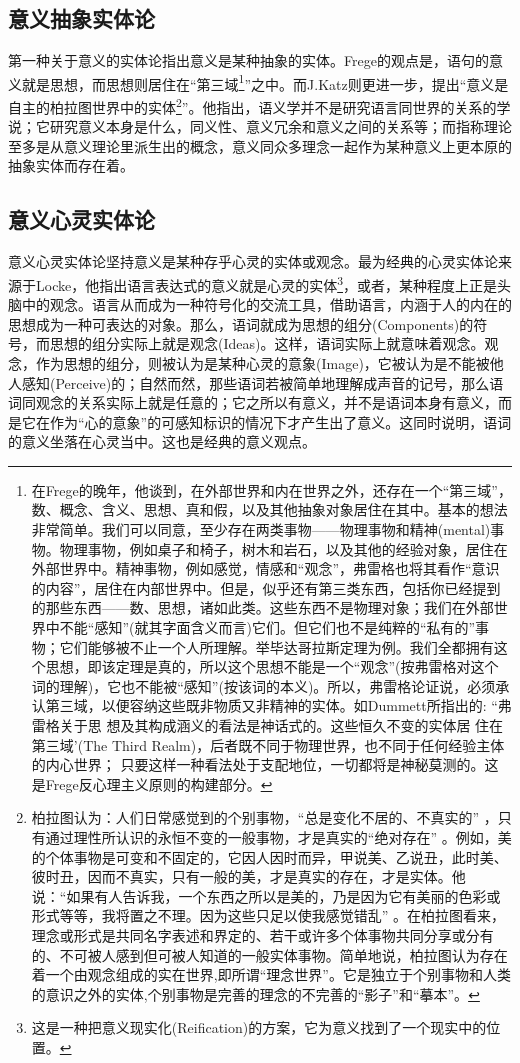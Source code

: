 \documentclass{article}
\begin{document}
\subsection{意义抽象实体论}
第一种关于意义的实体论指出意义是某种抽象的实体。Frege的观点是，语句的意义就是思想，而思想则居住在“第三域\footnote{在Frege的晚年，他谈到，在外部世界和内在世界之外，还存在一个“第三域”，数、概念、含义、思想、真和假，以及其他抽象对象居住在其中。基本的想法非常简单。我们可以同意，至少存在两类事物——物理事物和精神(mental)事物。物理事物，例如桌子和椅子，树木和岩石，以及其他的经验对象，居住在外部世界中。精神事物，例如感觉，情感和“观念”，弗雷格也将其看作“意识的内容”，居住在内部世界中。但是，似乎还有第三类东西，包括你已经提到的那些东西——数、思想，诸如此类。这些东西不是物理对象；我们在外部世界中不能“感知”(就其字面含义而言)它们。但它们也不是纯粹的“私有的”事物；它们能够被不止一个人所理解。举毕达哥拉斯定理为例。我们全都拥有这个思想，即该定理是真的，所以这个思想不能是一个“观念”(按弗雷格对这个词的理解)，它也不能被“感知”(按该词的本义)。所以，弗雷格论证说，必须承认第三域，以便容纳这些既非物质又非精神的实体。如Dummett所指出的: “弗雷格关于思
想及其构成涵义的看法是神话式的。这些恒久不变的实体居 
住在第三域’(The Third Realm)，后者既不同于物理世界，也不同于任何经验主体的内心世界；
只要这样一种看法处于支配地位，一切都将是神秘莫测的。这是Frege反心理主义原则的构建部分。}”之中。而J.Katz则更进一步，提出“意义是自主的柏拉图世界中的实体\footnote{柏拉图认为：人们日常感觉到的个别事物，“总是变化不居的、不真实的” ，只有通过理性所认识的永恒不变的一般事物，才是真实的“绝对存在” 。例如，美的个体事物是可变和不固定的，它因人因时而异，甲说美、乙说丑，此时美、彼时丑，因而不真实，只有一般的美，才是真实的存在，才是实体。他说：“如果有人告诉我，一个东西之所以是美的，乃是因为它有美丽的色彩或形式等等，我将置之不理。因为这些只足以使我感觉错乱” 。在柏拉图看来，理念或形式是共同名字表述和界定的、若干或许多个体事物共同分享或分有的、不可被人感到但可被人知道的一般实体事物。简单地说，柏拉图认为存在着一个由观念组成的实在世界,即所谓“理念世界”。它是独立于个别事物和人类的意识之外的实体,个别事物是完善的理念的不完善的“影子”和“摹本”。}”。他指出，语义学并不是研究语言同世界的关系的学说；它研究意义本身是什么，同义性、意义冗余和意义之间的关系等；而指称理论至多是从意义理论里派生出的概念，意义同众多理念一起作为某种意义上更本原的抽象实体而存在着。
\subsection{意义心灵实体论}
意义心灵实体论坚持意义是某种存乎心灵的实体或观念。最为经典的心灵实体论来源于Locke，他指出语言表达式的意义就是心灵的实体\footnote{这是一种把意义现实化(Reification)的方案，它为意义找到了一个现实中的位置。}，或者，某种程度上正是头脑中的观念。语言从而成为一种符号化的交流工具，借助语言，内涵于人的内在的思想成为一种可表达的对象。那么，语词就成为思想的组分(Components)的符号，而思想的组分实际上就是{\heiti 观念}(Ideas)。这样，语词实际上就意味着观念。观念，作为思想的组分，则被认为是某种心灵的意象(Image)，它被认为是不能被他人感知(Perceive)的；自然而然，那些语词若被简单地理解成声音的记号，那么语词同观念的关系实际上就是任意的；它之所以有意义，并不是语词本身有意义，而是它在作为“心的意象”的可感知标识的情况下才产生出了意义。这同时说明，语词的意义坐落在心灵当中。这也是经典的意义观点。
\end{document}
